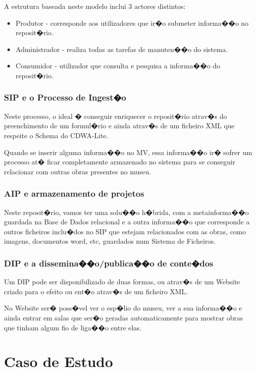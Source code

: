 \documentclass[a4paper,titlepage]{article}
\begin{document}
A estrutura baseada neste modelo inclui 3 actores distintos:
\begin{itemize}
	\item Produtor - corresponde aos utilizadores que ir�o submeter informa��o no reposit�rio.
	\item Administrador - realiza todas as tarefas de manuten��o do sistema.
	\item Consumidor - utilizador que consulta e pesquisa a informa��o do reposit�rio.
\end{itemize}

\subsubsection{SIP e o Processo de Ingest�o}

Neste processo, o ideal � conseguir enriquecer o reposit�rio atrav�s do preenchimento de um formul�rio e ainda atrav�s de um ficheiro XML que respeite o Schema do CDWA-Lite.

Quando se inserir alguma informa��o no MV, essa informa��o ir� sofrer um processo at� ficar completamente armazenado no sistema para se conseguir relacionar com outras obras presentes no museu.

\subsubsection{AIP e armazenamento de projetos}
Neste reposit�rio, vamos ter uma solu��o h�brida, com a metainforma��o guardada na Base de Dados relacional e a outra informa��o que corresponde a outros ficheiros inclu�dos no SIP que estejam relacionados com as obras, como imagens, documentos word, etc, guardados num Sistema de Ficheiros.

\subsubsection{DIP e a dissemina��o/publica��o de conte�dos}

Um DIP pode ser disponibilizado de duas formas, ou atrav�s de um Website criado para o efeito ou ent�o atrav�s de um ficheiro XML.

No Website ser� poss�vel ver o esp�lio do museu, ver a sua informa��o e ainda entrar em salas que ser�o geradas automaticamente para mostrar obras que tinham algum fio de liga��o entre elas.


\section{Caso de Estudo}
\end{document}
